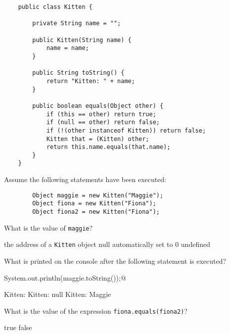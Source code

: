 \documentclass[addpoints,9pt]{exam}
\begin{document}
\newpage


\pointsinmargin
\bracketedpoints

\marginpointname{}

\begin{questions}

\begin{lstlisting}
    public class Kitten {

        private String name = "";

        public Kitten(String name) {
            name = name;
        }

        public String toString() {
            return "Kitten: " + name;
        }

        public boolean equals(Object other) {
            if (this == other) return true;
            if (null == other) return false;
            if (!(other instanceof Kitten)) return false;
            Kitten that = (Kitten) other;
            return this.name.equals(that.name);
        }
    }
\end{lstlisting}
Assume the following statements have been executed:
\begin{lstlisting}
        Object maggie = new Kitten("Maggie");
        Object fiona = new Kitten("Fiona");
        Object fiona2 = new Kitten("Fiona");
\end{lstlisting}

\question[3] What is the value of {\tt maggie}?

\begin{choices}
\correctchoice the address of a {\tt Kitten} object
\choice null
\choice automatically set to 0
\choice undefined
\end{choices}


\question[3] What is printed on the console after the following statement is executed?

\verb@ System.out.println(maggie.toString());@

\begin{choices}
\correctchoice Kitten:
\choice Kitten: null
\choice Kitten: Maggie
\end{choices}

\question[3] What is the value of the expression {\tt fiona.equals(fiona2)}?

\begin{choices}
\correctchoice true
\choice false
\end{choices}


\end{questions}
\end{document}
